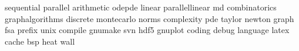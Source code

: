 sequential
parallel
arithmetic
odepde
linear
parallellinear
md
combinatorics
graphalgorithms
discrete
montecarlo
norms
complexity
pde
taylor
newton
graph
fsa
prefix
unix
compile
gnumake
svn
hdf5
gnuplot
coding
debug
language
latex
cache
bsp
heat
wall
